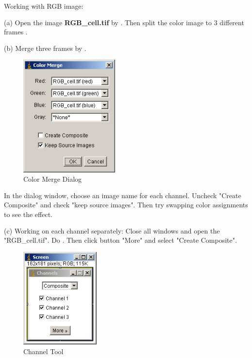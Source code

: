 \begin{indentexercise}{1}
Working with RGB image:
 
\item (a) Open the image \textbf{RGB\_cell.tif} by . Then split the color image to 3 different frames . 

\item (b) Merge three frames by . 

\begin{figure}[H]
\begin{center}
\includegraphics[width=5cm]{img/CMCIBasicCourse201102-img14.png}
\caption{ Color Merge Dialog}
\label{fig:img14}
\end{center}
\end{figure}

In the dialog window, choose an image name for each channel. Uncheck
"Create Composite" and check
"keep source images". Then try
swapping color assignments to see the effect. 

\item (c) Working on each channel separately: Close all windows and
open the "RGB\_cell.tif". Do
. Then click button "More" and select "Create Composite".
\begin{figure}[H]
\begin{center}
\includegraphics[width=4cm]{img/CMCIBasicCourse201102-img15.png}
\caption{ Channel Tool}
\label{fig:img15}
\end{center}
\end{figure}


\end{indentexercise}

